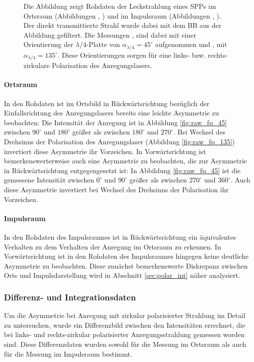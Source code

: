 \documentclass[titlepage,  ngerman]{article}
\begin{document}
\begin{figure}[h]
\begin{subfigure}{0.5\textwidth}
		\end{subfigure}
		\caption[Rohdaten PSHE]{Die Abbildung zeigt Rohdaten der Leckstrahlung eines SPPs im Ortsraum (Abbildungen , ) und im Impulsraum (Abbildungen , ). Der direkt transmittierte Strahl wurde dabei mit dem BB aus der Abbildung gefiltert. Die Messungen ,  sind dabei mit einer Orientierung der $\lambda / 4$-Platte von $\alpha_{\lambda/4} = 45^\circ$ aufgenommen und ,  mit $\alpha_{\lambda/4} = 135^\circ$. Diese Orientierungen sorgen für eine links- bzw. rechts-zirkulare Polarisation des Anregungslasers.}
		\label{fig:measure_pshe_raw}			
	\end{figure}
	\paragraph{Ortsraum}
	In den Rohdaten ist im Ortsbild in Rückwärtsrichtung bezüglich der Einfallsrichtung des Anregungslasers bereits eine leichte Asymmetrie zu beobachten: Die Intensität der Anregung ist in Abbildung \ref{fig:raw_fp_45} zwischen $90^\circ$ und $180^\circ$ größer als zwischen $180^\circ$ und $270^\circ$. Bei Wechsel des Drehsinns der Polarisation des Anregungslaser (Abbildung \ref{fig:raw_fp_135}) invertiert diese Asymmetrie ihr Vorzeichen. In Vorwärtsrichtung ist bemerkenswerterweise auch eine Asymmetrie zu beobachten, die zur Asymmetrie in Rückwärtsrichtung entgegengesetzt ist: In Abbildung \ref{fig:raw_fp_45} ist die gemessene Intensität zwischen $0^\circ$ und $90^\circ$ größer als zwischen $270^\circ$ und $360^\circ$. Auch diese Asymmetrie invertiert bei Wechsel des Drehsinns der Polarisation ihr Vorzeichen. 
	\paragraph{Impulsraum} 
	In den Rohdaten des Impulsraumes ist in Rückwärtsrichtung ein äquivalentes Verhalten zu dem Verhalten der Anregung im Ortsraum zu erkennen. In Vorwärtsrichtung ist in den Rohdaten des Impulsraumes hingegen keine deutliche Asymmetrie zu beobachten. Diese zunächst bemerkenswerte Diskrepanz zwischen Orts und Impulsdarstellung wird in Abschnitt \ref{sec:polar_int} näher analysiert.
	\subsubsection{Differenz- und Integrationsdaten}
		Um die Asymmetrie bei Anregung mit zirkular polarisierter Strahlung im Detail zu untersuchen, wurde ein Differenzbild zwischen den Intensitäten errechnet, die bei links- und rechts-zirkular polarisierter Anregungsstrahlung gemessen worden sind. Diese Differenzdaten wurden sowohl für die Messung im Ortsraum als auch für die Messung im Impulsraum bestimmt.			
\end{document}
